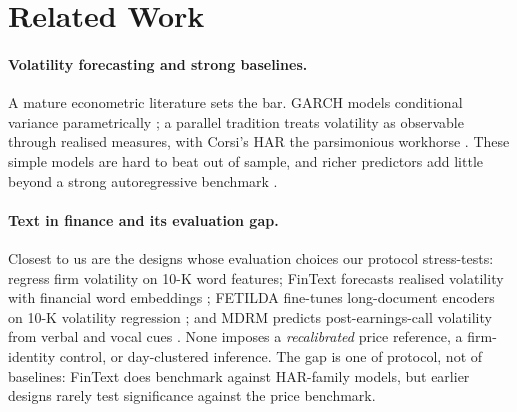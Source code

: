 \section{Related Work}
\label{sec:related}

\paragraph{Volatility forecasting and strong baselines.}
A mature econometric literature sets the bar. GARCH models conditional variance parametrically \citep{bollerslev1986garch,nelson1991egarch}; a parallel tradition treats volatility as observable through realised measures, with Corsi's HAR the parsimonious workhorse \citep{corsi2009har}. These simple models are hard to beat out of sample, and richer predictors add little beyond a strong autoregressive benchmark \citep{hansen2005garch,paye2012dejavol}.

\paragraph{Text in finance and its evaluation gap.}
Closest to us are the designs whose evaluation choices our protocol stress-tests: \citet{kogan2009predicting} regress firm volatility on 10-K word features; FinText forecasts realised volatility with financial word embeddings \citep{rahimikia2021fintext}; FETILDA fine-tunes long-document encoders on 10-K volatility regression \citep{fetilda2022}; and MDRM predicts post-earnings-call volatility from verbal and vocal cues \citep{qin2019mdrm}. None imposes a \emph{recalibrated} price reference, a firm-identity control, or day-clustered inference. The gap is one of protocol, not of baselines: FinText does benchmark against HAR-family models, but earlier designs rarely test significance against the price benchmark.

